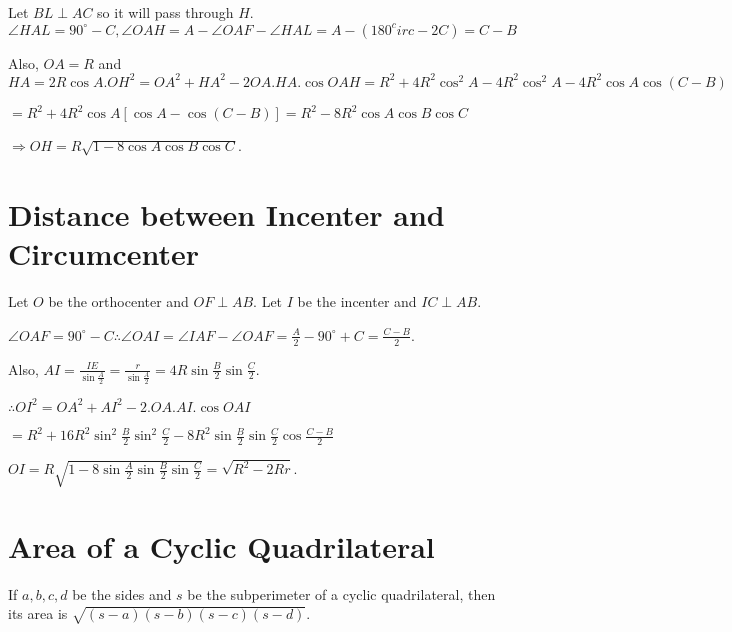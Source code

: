 Let $BL\perp AC$ so it will pass through $H$. $\angle HAL = 90^\circ - C, \angle OAH = A - \angle OAF - \angle HAL = A - (180^circ
- 2C) = C - B$

Also, $OA = R$ and $HA = 2R\cos A. OH^2 = OA^2 + HA^2 - 2OA.HA.\cos OAH = R^2 + 4R^2\cos^2A - 4R^2\cos^2A - 4R^2\cos A\cos(C - B)$

$= R^2 + 4R^2\cos A[\cos A - \cos(C - B)] = R^2 - 8R^2\cos A\cos B\cos C$

$\Rightarrow OH = R\sqrt{1 - 8\cos A\cos B\cos C}$.

\section{Distance between Incenter and Circumcenter}
Let $O$ be the orthocenter and $OF\perp AB$. Let $I$ be the incenter and $IC\perp AB$.

$\angle OAF = 90^\circ - C \therefore \angle OAI = \angle IAF - \angle OAF = \frac{A}{2} - 90^\circ + C = \frac{C - B}{2}$.

Also, $AI = \frac{IE}{\sin\frac{A}{2}} = \frac{r}{\sin\frac{A}{2}} = 4R\sin\frac{B}{2}\sin\frac{C}{2}$.

$\therefore OI^2 = OA^2 + AI^2 - 2.OA.AI.\cos OAI$

$ = R^2 + 16R^2\sin^2\frac{B}{2}\sin^2\frac{C}{2} - 8R^2\sin\frac{B}{2}\sin\frac{C}{2}\cos\frac{C - B}{2}$

$OI = R\sqrt{1 - 8\sin\frac{A}{2}\sin\frac{B}{2}\sin\frac{C}{2}} = \sqrt{R^2 - 2Rr}$.

\section{Area of a Cyclic Quadrilateral}
\begin{theorem}
  \begin{center}
  \end{center}

  If $a, b, c, d$ be the sides and $s$ be the subperimeter of a cyclic quadrilateral, then its area is $\sqrt{(s - a)(s - b)(s -
    c)(s - d)}$.
\end{theorem}

